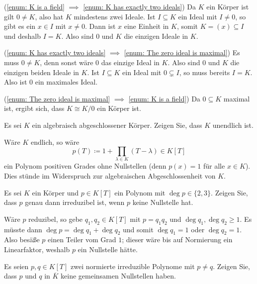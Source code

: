 \begin{solution}
  (\ref{enum: K is a field} $\implies$ \ref{enum: K has exactly two ideals})
  Da $K$ ein Körper ist gilt $0 \neq K$, also hat $K$ mindestens zwei Ideale.
  Ist $I \subseteq K$ ein Ideal mit $I \neq 0$, so gibt es ein $x \in I$ mit $x \neq 0$.
  Dann ist $x$ eine Einheit in $K$, somit $K = (x) \subseteq I$ und deshalb $I = K$.
  Also sind $0$ und $K$ die einzigen Ideale in $K$.
  
  (\ref{enum: K has exactly two ideals} $\implies$ \ref{enum: The zero ideal is maximal})
  Es muss $0 \neq K$, denn sonst wäre $0$ das einzige Ideal in $K$.
  Also sind $0$ und $K$ die einzigen beiden Ideale in $K$.
  Ist $I \subseteq K$ ein Ideal mit $0 \subsetneq I$, so muss bereits $I = K$.
  Also ist $0$ ein maximales Ideal.
  
  (\ref{enum: The zero ideal is maximal} $\implies$ \ref{enum: K is a field})
  Da $0 \subseteq K$ maximal ist, ergibt sich, dass $K \cong K/0$ ein Körper ist.
\end{solution}


\begin{question}
  Es sei $K$ ein algebraisch abgeschlossener Körper.
  Zeigen Sie, dass $K$ unendlich ist.
\end{question}


\begin{solution}
  Wäre $K$ endlich, so wäre
  \[
              p(T)
    \coloneqq 1 + \prod_{\lambda \in K} (T - \lambda)
    \in       K[T]
  \]
  ein Polynom positiven Grades ohne Nullstellen (denn $p(x) = 1$ für alle $x \in K$).
  Dies stünde im Widerspruch zur algebraischen Abgeschlossenheit von $K$.
\end{solution}


\begin{question}
  Es sei $K$ ein Körper und $p \in K[T]$ ein Polynom mit $\deg p \in \{2, 3\}$.
  Zeigen Sie, dass $p$ genau dann irreduzibel ist, wenn $p$ keine Nullstelle hat.
\end{question}


\begin{solution}
  Wäre $p$ reduzibel, so gebe $q_1, q_2 \in K[T]$ mit $p = q_1 q_2$ und $\deg q_1, \deg q_2 \geq 1$.
  Es müsste dann $\deg p = \deg q_1 + \deg q_2$ und somit $\deg q_1 = 1$ oder $\deg q_2 = 1$.
  Also besäße $p$ einen Teiler vom Grad $1$;
  dieser wäre bis auf Normierung ein Linearfaktor, weshalb $p$ ein Nullstelle hätte.
\end{solution}


\begin{question}
  Es seien $p, q \in K[T]$ zwei normierte irreduzible Polynome mit $p \neq q$.
  Zeigen Sie, dass $p$ und $q$ in $\overline{K}$ keine gemeinsamen Nullstellen haben.
\end{question}


